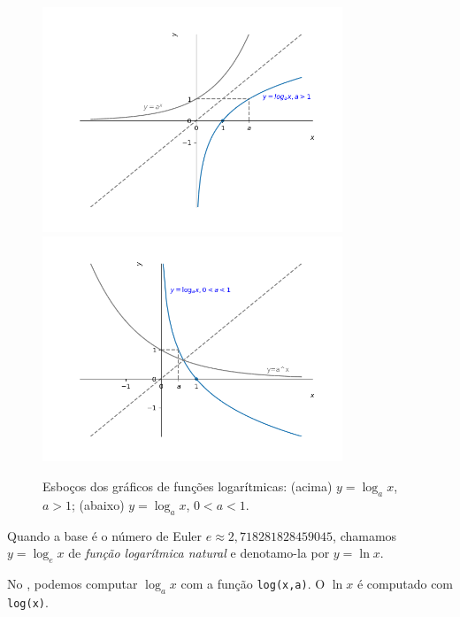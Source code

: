 \begin{figure}[H]
  \centering
  \includegraphics[width=0.8\textwidth]{./cap_funcao/dados/fig_log_graficos/fig_log_2}\\
  \includegraphics[width=0.8\textwidth]{./cap_funcao/dados/fig_log_graficos/fig_log_12}
  \caption{Esboços dos gráficos de funções logarítmicas: (acima) $y = \log_a x$, $a>1$; (abaixo) $y = \log_a x$, $0<a<1$.}
  \label{fig:log_graficos}
\end{figure}

\begin{obs}
  Quando a base é o número de Euler $e \approx 2,718281828459045$, chamamos $y = \log_e x$ de \emph{função logarítmica natural} e denotamo-la por $y = \ln x$.

  \ifispython
  No \sympy, podemos computar $\log_a x$ com a função \lstinline+log(x,a)+. O $\ln x$ é computado com \lstinline+log(x)+.
  \fi
\end{obs}

